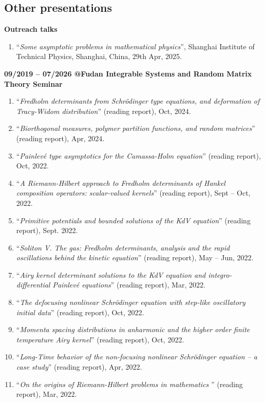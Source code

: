 \documentclass[margin]{res}
\begin{document}
\begin{resume}
\section{Other presentations}
\textbf{Outreach talks}
\begin{enumerate}[--]
\item ``{\sl Some asymptotic problems in mathematical physics}'', Shanghai Institute of Technical Physics, Shanghai, China, 29th Apr, 2025.
\end{enumerate}

\textbf{09/2019 -- 07/2026 @Fudan Integrable Systems and Random Matrix Theory Seminar }
\begin{enumerate}[--]
\item ``{\sl Fredholm determinants from Schr\"odinger type equations, and deformation of Tracy-Widom distribution}'' (reading report), Oct, 2024.
\item ``{\sl Biorthogonal measures, polymer partition functions, and random matrices}'' (reading report), Apr, 2024.
\item ``{\sl Painlev\'e type asymptotics for the Camassa-Holm equation}'' (reading report), Oct, 2022.
\item ``{\sl A Riemann-Hilbert approach to Fredholm determinants of Hankel composition operators: scalar-valued kernels}'' (reading report), Sept -- Oct, 2022.
\item ``{\sl Primitive potentials and bounded solutions of the KdV equation}'' (reading report), Sept. 2022.
\item ``{\sl Soliton V. The gas: Fredholm determinants, analysis and the rapid oscillations behind the kinetic equation}'' (reading report), May -- Jun, 2022.
\item ``{\sl Airy kernel determinant solutions to the KdV equation and integro-differential Painlev\'e equations}'' (reading report), Mar, 2022.
\item ``{\sl The defocusing nonlinear Schr\"odinger equation with step-like oscillatory initial data}'' (reading report), Oct, 2022.
\item ``{\sl Momenta spacing distributions in anharmonic and the higher order finite temperature Airy kernel}'' (reading report), Oct, 2022.
\item ``{\sl Long-Time behavior of the non-focusing nonlinear Schr\"odinger equation -- a case study}'' (reading report), Apr, 2022.
\item ``{\sl On the origins of Riemann-Hilbert problems in mathematics} '' (reading report), Mar, 2022.
\end{enumerate}



\end{resume}
\end{document}

